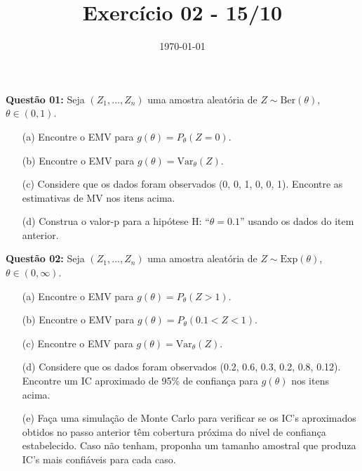 \documentclass[a4paper]{article}
\date{\today}
\title{Exercício 02 - 15/10}
\begin{document}
    \header{}

\textbf{Questão 01:}  
Seja $(Z_1, \ldots, Z_n)$ uma amostra aleatória de $Z \sim \text{Ber}(\theta)$, $\theta \in (0,1)$.
\begin{itemize}
  \item[(a)] Encontre o EMV para $g(\theta) = P_\theta(Z = 0)$.
  \item[(b)] Encontre o EMV para $g(\theta) = \mathrm{Var}_\theta(Z)$.
  \item[(c)] Considere que os dados foram observados (0, 0, 1, 0, 0, 1). Encontre as estimativas de MV nos itens acima.
  \item[(d)] Construa o valor-p para a hipótese H: ``$\theta = 0.1$'' usando os dados do item anterior.
\end{itemize}
    
\begin{research}[]
 
    \end{research}

    \begin{answer}[]
 
    \end{answer}

\textbf{Questão 02:}  
Seja $(Z_1, \ldots, Z_n)$ uma amostra aleatória de $Z \sim \text{Exp}(\theta)$, $\theta \in (0,\infty)$.
\begin{itemize}
  \item[(a)] Encontre o EMV para $g(\theta) = P_\theta(Z > 1)$.
  \item[(b)] Encontre o EMV para $g(\theta) = P_\theta(0.1 < Z < 1)$.
  \item[(c)] Encontre o EMV para $g(\theta) = \mathrm{Var}_\theta(Z)$.
  \item[(d)] Considere que os dados foram observados (0.2, 0.6, 0.3, 0.2, 0.8, 0.12). Encontre um IC aproximado de 95\% de confiança para $g(\theta)$ nos itens acima.
  \item[(e)] Faça uma simulação de Monte Carlo para verificar se os IC's aproximados obtidos no passo anterior têm cobertura próxima do nível de confiança estabelecido. Caso não tenham, proponha um tamanho amostral que produza IC's mais confiáveis para cada caso.
\end{itemize}
   
\begin{research}[]
 
    \end{research}

\begin{answer}[]

    \end{answer}
\end{document}
